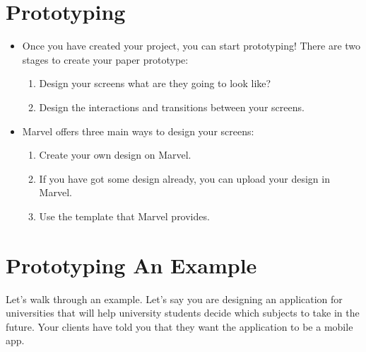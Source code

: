 \documentclass[letterpaper,10pt,english]{jupyterBook}
\begin{document}
\section{Prototyping}
\label{\detokenize{appendices/appendix_e/marvel_guide:prototyping}}\begin{itemize}
\item {} 
\sphinxAtStartPar
Once you have created your project, you can start prototyping! There are two stages to create your paper prototype:
\begin{enumerate}
%
\item {} 
\sphinxAtStartPar
Design your screens \sphinxhyphen{} what are they going to look like?

\item {} 
\sphinxAtStartPar
Design the interactions and transitions between your screens.

\end{enumerate}

\item {} 
\sphinxAtStartPar
Marvel offers three main ways to design your screens:
\begin{enumerate}
%
\item {} 
\sphinxAtStartPar
Create your own design on Marvel.

\item {} 
\sphinxAtStartPar
If you have got some design already, you can upload your design in Marvel.

\item {} 
\sphinxAtStartPar
Use the template that Marvel provides.

\end{enumerate}

\end{itemize}


\section{Prototyping \sphinxhyphen{} An Example}
\label{\detokenize{appendices/appendix_e/marvel_guide:prototyping-an-example}}
\sphinxAtStartPar
Let’s walk through an example.  Let’s say you are designing an application for universities that will help university
students decide which subjects to take in the future. Your clients have told you that they want the application to
be a mobile app.
\end{document}
